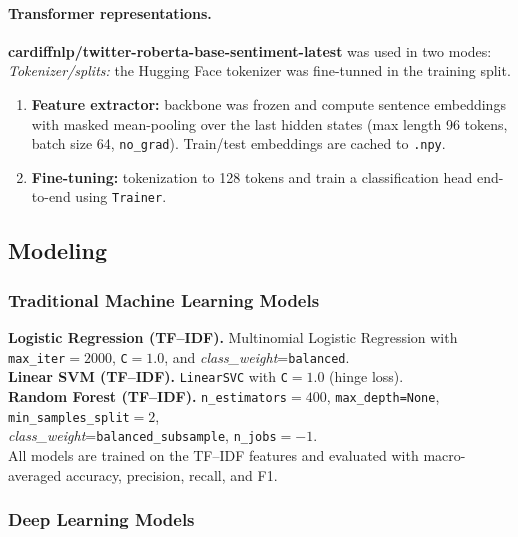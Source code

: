 \documentclass[10pt]{article}
\begin{document}
\paragraph{Transformer representations.}
\textbf{cardiffnlp/twitter-roberta-base-sentiment-latest} was used in two modes:
\textit{Tokenizer/splits:} the Hugging Face tokenizer was fine-tunned in the training split.
\begin{enumerate}
  \item \textbf{Feature extractor:} backbone was frozen and compute sentence embeddings with masked mean-pooling over the last hidden states (max length 96 tokens, batch size 64, \texttt{no\_grad}). Train/test embeddings are cached to \texttt{.npy}.
  \item \textbf{Fine-tuning:} tokenization to 128 tokens and train a classification head end-to-end using \texttt{Trainer}.
\end{enumerate}
\subsection{Modeling}

\subsubsection{Traditional Machine Learning Models}
\textbf{Logistic Regression (TF--IDF).} Multinomial Logistic Regression with \texttt{max\_iter}$=2000$, \texttt{C}$=1.0$, and \textit{class\_weight}=\texttt{balanced}.\\
\textbf{Linear SVM (TF--IDF).} \texttt{LinearSVC} with \texttt{C}$=1.0$ (hinge loss).\\
\textbf{Random Forest (TF--IDF).} \texttt{n\_estimators}$=400$, \texttt{max\_depth=None}, \texttt{min\_samples\_split}$=2$,\\
\textit{class\_weight}=\texttt{balanced\_subsample}, \texttt{n\_jobs}$=-1$.\\
All models are trained on the TF--IDF features and evaluated with macro-averaged accuracy, precision, recall, and F1.

\subsubsection{Deep Learning Models}
\end{document}
